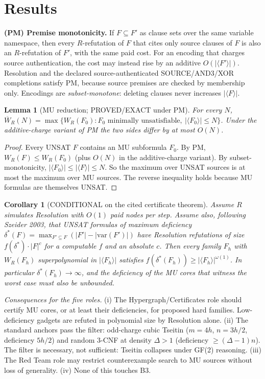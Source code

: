 \documentclass[11pt]{article}
\newtheorem{lemma}{Lemma}
\newtheorem{corollary}{Corollary}
\begin{document}
\section{Results}
\textbf{(PM) Premise monotonicity.} If $F\subseteq F'$ as clause sets over the same
variable namespace, then every $R$-refutation of $F$ that cites only source clauses of $F$
is also an $R$-refutation of $F'$, with the same paid cost.
For an encoding that charges source authentication, the cost may instead rise by an additive $O(|\langle F'\rangle|)$.
Resolution and the declared source-authenticated SOURCE/AND3/XOR completions satisfy PM, because source
premises are checked by membership only. Encodings are \emph{subset-monotone}: deleting clauses never increases $|\langle F\rangle|$.

\begin{lemma}[MU reduction; PROVED/EXACT under PM]
For every $N$,
$\overline W_R(N)=\max\{W_R(F_0): F_0 \text{ minimally unsatisfiable},\ |\langle F_0\rangle|\le N\}$.
Under the additive-charge variant of PM the two sides differ by at most $O(N)$.
\end{lemma}
\begin{proof}
Every UNSAT $F$ contains an MU subformula $F_0$. By PM, $W_R(F)\le W_R(F_0)$ (plus $O(N)$ in the additive-charge variant).
By subset-monotonicity, $|\langle F_0\rangle|\le|\langle F\rangle|\le N$. So the maximum over UNSAT sources is at most the maximum over MU sources.
The reverse inequality holds because MU formulas are themselves UNSAT.
\end{proof}

\begin{corollary}[CONDITIONAL on the cited certificate theorem]
Assume $R$ simulates Resolution with $O(1)$ paid nodes per step. Assume also, following Szeider 2003, that
UNSAT formulas of maximum deficiency $\delta^*(F)=\max_{F'\subseteq F}(|F'|-|\mathrm{var}(F')|)$
have Resolution refutations of size $f(\delta^*)\cdot|F|^{c}$ for a computable $f$ and an absolute $c$.
Then every family $F_h$ with $W_R(F_h)$ superpolynomial in $|\langle F_h\rangle|$ satisfies
$f(\delta^*(F_h))\ge |\langle F_h\rangle|^{\omega(1)}$.
In particular $\delta^*(F_h)\to\infty$, and the deficiency of the MU cores that witness the worst case must also be unbounded.
\end{corollary}

\noindent\emph{Consequences for the five roles.}
(i) The Hypergraph/Certificates role should certify MU cores, or at least their deficiencies, for proposed hard families.
Low-deficiency gadgets are refuted in polynomial size by Resolution alone.
(ii) The standard anchors pass the filter: odd-charge cubic Tseitin ($m=4h$, $n=3h/2$, deficiency $5h/2$)
and random 3-CNF at density $\Delta>1$ (deficiency $\ge(\Delta-1)n$).
The filter is necessary, not sufficient: Tseitin collapses under GF(2) reasoning.
(iii) The Red Team role may restrict counterexample search to MU sources without loss of generality.
(iv) None of this touches B3.
\end{document}
